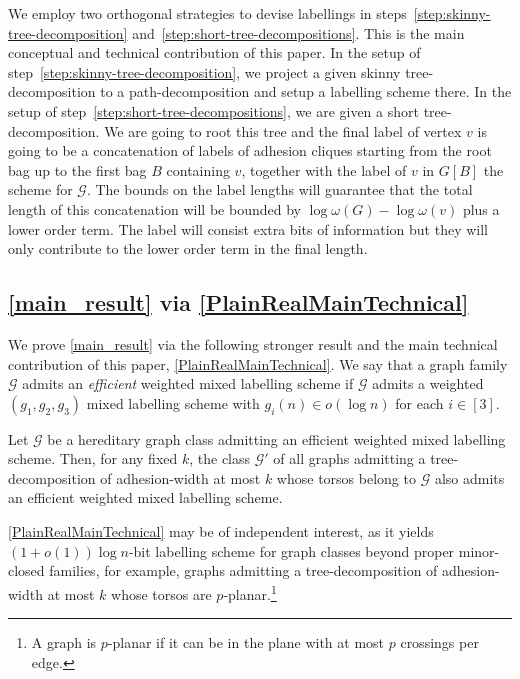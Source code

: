 \documentclass{patmorin}
\newcommand{\defin}[1]{\emph{\textcolor{brightmaroon}{#1}}}
\newcommand{\calG}{\mathcal{G}}
\begin{document}
We employ two orthogonal strategies to devise labellings in steps~\ref{step:skinny-tree-decomposition} and~\ref{step:short-tree-decompositions}. 
This is the main conceptual and technical contribution of this paper. 
In the setup of step~\ref{step:skinny-tree-decomposition}, 
we project a given skinny tree-decomposition to a path-decomposition and setup a labelling scheme there. 
In the setup of step~\ref{step:short-tree-decompositions}, we are given a short tree-decomposition. 
We are going to root this tree and the final label of vertex $v$ is going to be a concatenation of labels of adhesion cliques starting from the root bag up to the first bag $B$ containing $v$, 
together with the label of $v$ in $G[B]$ the scheme for $\calG$. 
The bounds on the label lengths will guarantee that the total length of this concatenation will be bounded by $\log\omega(G)-\log\omega(v)$ plus a lower order term. 
The label will consist extra bits of information but they will only contribute to the lower order term in the final length.


\subsection{\cref{main_result} via \cref{PlainRealMainTechnical}}\label{ssec:maintech}


We prove \cref{main_result} via the following stronger result and the main technical contribution of this paper, \cref{PlainRealMainTechnical}.  We say that a graph family $\calG$ admits an \defin{efficient} weighted mixed labelling scheme if $\calG$ admits a weighted $(g_1,g_2,g_3)$ mixed labelling scheme with $g_i(n)\in o(\log n)$ for each $i\in [3]$. 


\begin{thm}\label{PlainRealMainTechnical}
    Let $\calG$ be a hereditary graph class admitting an efficient weighted mixed labelling scheme. Then, for any fixed $k$, the class $\calG'$ of all graphs admitting a tree-decomposition of adhesion-width at most $k$ whose torsos belong to $\calG$ also admits an efficient weighted mixed labelling scheme.
\end{thm}

\cref{PlainRealMainTechnical} may be of independent interest, as it yields $(1+o(1))\log n$-bit labelling scheme for graph classes beyond proper minor-closed families, for example, graphs admitting a tree-decomposition of adhesion-width at most $k$ whose torsos are $p$-planar.\footnote{A graph is $p$-planar if it can be in the plane with at most $p$ crossings per edge.}
\end{document}
